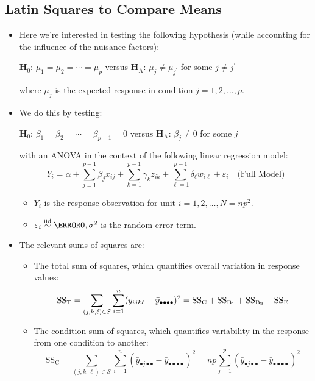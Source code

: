 \subsection{Latin Squares to Compare Means}
\begin{itemize}
    \item Here we're interested in testing the following hypothesis (while accounting for the influence of the
          nuisance factors):
          \begin{tightcenter}
              $ \mathbf{H}_0 $: $ \mu_1=\mu_2=\cdots=\mu_p $ versus $ \mathbf{H}_\text{A} $: $ \mu_j\ne \mu_{j^\prime} $ for some $ j\ne j^\prime $
          \end{tightcenter}
          where $ \mu_j $ is the expected response in condition $ j=1,2,\ldots,p $.
    \item We do this by testing:
          \begin{tightcenter}
              $ \mathbf{H}_0 $: $ \beta_1=\beta_2=\cdots=\beta_{p-1}=0 $ versus $ \mathbf{H}_\text{A} $: $ \beta_j\ne 0$ for some $ j $
          \end{tightcenter}
          with an ANOVA in the context of the following linear regression model:
          \[ Y_i=\alpha+\sum_{j=1}^{p-1} \beta_j x_{ij}+\sum_{k=1}^{p-1} \gamma_k z_{ik}+\sum_{\ell=1}^{p-1} \delta_\ell w_{i\ell}+\varepsilon_i\quad \text{(Full Model)} \]
          \begin{itemize}
              \item $ Y_i $ is the response observation for unit $ i=1,2,\ldots,N=np^2 $.
              \item $ \varepsilon_i \stackrel{\text{iid}}{\sim} \N{0,\sigma^2} $ is the random error term.
          \end{itemize}
    \item The relevant sums of squares are:
          \begin{itemize}
              \item The total sum of squares, which quantifies overall variation in response values:
                    \[ \text{SS}_{\text{T}}=\sum_{(j,k,\ell)\in \mathcal{S}}\sum_{i=1}^{n} (y_{ijk\ell}-\bar{y}_{\bullet\bullet\bullet\bullet})^2=\text{SS}_{\text{C}}+\text{SS}_{\text{B}_1}+\text{SS}_{\text{B}_2}+\text{SS}_{\text{E}}  \]
              \item The condition sum of squares, which quantifies variability in the response from one condition to another:
                    \[ \text{SS}_{\text{C}}=\sum_{(j,k,\ell)\in \mathcal{S}}\sum_{i=1}^{n} (\bar{y}_{\bullet j\bullet\bullet}-\bar{y}_{\bullet\bullet\bullet\bullet})^2=np \sum_{j=1}^{p} (\bar{y}_{\bullet j\bullet\bullet}-\bar{y}_{\bullet\bullet\bullet\bullet})^2  \]

\end{itemize}
\end{itemize}
